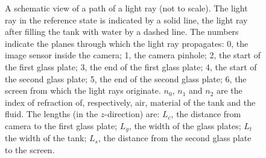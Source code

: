 \documentclass{svjour3}                     %
\begin{document}
\begin{figure}[htbp]
	
	\caption{A schematic view of a path of a light ray (not to scale). The light ray in the reference state is indicated by a solid line, the light ray after filling the tank with water by a dashed line. The numbers indicate the planes through which the light ray propagates: 0, the image sensor inside the camera; 1, the camera pinhole; 2, the start of the first glass plate; 3, the end of the first glass plate; 4, the start of the second glass plate; 5, the end of the second glass plate; 6, the screen from which the light rays originate.  $n_0$, $n_1$ and $n_2$ are the index of refraction of, respectively, air, material of the tank and the fluid. The lengths (in the $z$-direction) are: $L_c$, the distance from camera to the first glass plate; $L_g$, the width of the glass plates; $L_t$ the width of the tank; $L_s$, the distance from the second glass plate to the screen.}	
\label{fig:schviepalira}	
\end{figure}
\end{document}
